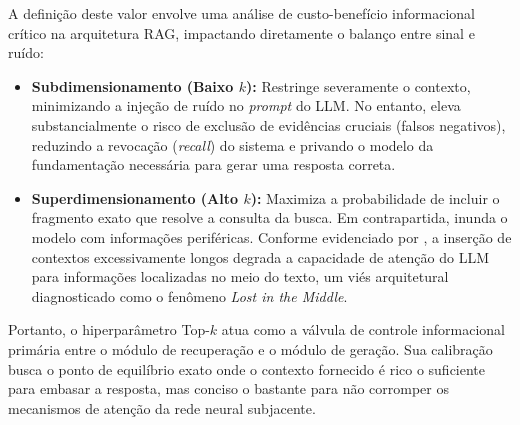 A definição deste valor envolve uma análise de custo-benefício informacional crítico na arquitetura RAG, impactando diretamente o balanço entre sinal e ruído:

\begin{itemize}
  \item \textbf{Subdimensionamento (Baixo $k$):} Restringe severamente o contexto, minimizando a injeção de ruído no \textit{prompt} do LLM. No entanto, eleva substancialmente o risco de exclusão de evidências cruciais (falsos negativos), reduzindo a revocação (\textit{recall}) do sistema e privando o modelo da fundamentação necessária para gerar uma resposta correta.

  \item \textbf{Superdimensionamento (Alto $k$):} Maximiza a probabilidade de incluir o fragmento exato que resolve a consulta da busca. Em contrapartida, inunda o modelo com informações periféricas. Conforme evidenciado por \citet{liu2023_lost}, a inserção de contextos excessivamente longos degrada a capacidade de atenção do LLM para informações localizadas no meio do texto, um viés arquitetural diagnosticado como o fenômeno \textit{Lost in the Middle}.

\end{itemize}



Portanto, o hiperparâmetro Top-$k$ atua como a válvula de controle informacional primária entre o módulo de recuperação e o módulo de geração. Sua calibração busca o ponto de equilíbrio exato onde o contexto fornecido é rico o suficiente para embasar a resposta, mas conciso o bastante para não corromper os mecanismos de atenção da rede neural subjacente.
